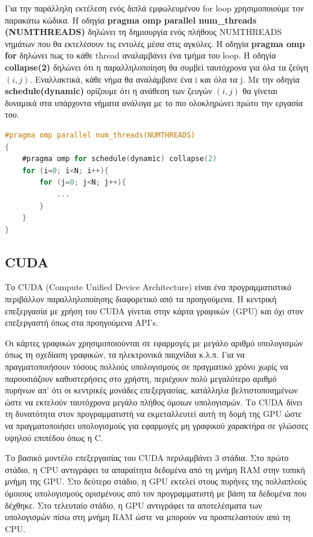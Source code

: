 \documentclass[12pt,a4paper]{article}
\begin{document}
Για την παράλληλη εκτέλεση ενός διπλά εμφωλευμένου for loop χρησιμοποιούμε τον παρακάτω κώδικα. Η οδηγία \textbf{pragma omp parallel num\_threads (NUMTHREADS)} δηλώνει τη δημιουργία ενός πλήθους NUMTHREADS νημάτων που θα εκτελέσουν τις εντολές μέσα στις αγκύλες. Η οδηγία \textbf{pragma omp for} δηλώνει πως το κάθε thread αναλαμβάνει ένα τμήμα του loop. Η οδηγία \textbf{collapse(2)} δηλώνει ότι η παραλληλοποίηση θα συμβεί ταυτόχρονα για όλα τα ζεύγη $(i,j)$. Εναλλακτικά, κάθε νήμα θα αναλάμβανε ένα i και όλα τα j. Με την οδηγία \textbf{schedule(dynamic)} ορίζουμε ότι η ανάθεση των ζευγών $(i,j)$ θα γίνεται δυναμικά στα υπάρχοντα νήματα ανάλογα με το πιο ολοκληρώνει πρώτο την εργασία του.

\begin{lstlisting}[language=C,frame=single]
#pragma omp parallel num_threads(NUMTHREADS)
{
	#pragma omp for schedule(dynamic) collapse(2)
	for (i=0; i<N; i++){
		for (j=0; j<N; j++){
			...
		}
	}
}
\end{lstlisting}

\subsection{CUDA}

Το CUDA (Compute Unified Device Architecture) \cite{nickolls_scalable_2008} είναι ένα προγραμματιστικό περιβάλλον παραλληλοποίησης διαφορετικό από τα προηγούμενα. Η κεντρική επεξεργασία με χρήση του CUDA γίνεται στην κάρτα γραφικών (GPU) και όχι στον επεξεργαστή όπως στα προηγούμενα API's.

Οι κάρτες γραφικών χρησιμοποιούνται σε εφαρμογές με μεγάλο αριθμό υπολογισμών όπως τη σχεδίαση γραφικών, τα ηλεκτρονικά παιχνίδια κ.λ.π. Για να πραγματοποιήσουν τόσους πολλούς υπολογισμούς σε πραγματικό χρόνο χωρίς να παρουσιάζουν καθυστερήσεις στο χρήστη, περιέχουν πολύ μεγαλύτερο αριθμό πυρήνων απ' ότι οι κεντρικές μονάδες επεξεργασίας, κατάλληλα βελτιστοποιημένων ώστε να εκτελούν ταυτόχρονα μεγάλο πλήθος όμοιων υπολογισμών. Το CUDA δίνει τη δυνατότητα στον προγραμματιστή να εκμεταλλευτεί αυτή τη δομή της GPU ώστε να πραγματοποιήσει υπολογισμούς για εφαρμογές μη γραφικού χαρακτήρα σε γλώσσες υψηλού επιπέδου όπως η C.

Το βασικό μοντέλο επεξεργασίας του CUDA περιλαμβάνει 3 στάδια. Στο πρώτο στάδιο, η CPU αντιγράφει τα απαραίτητα δεδομένα από τη μνήμη RAM στην τοπική μνήμη της GPU. Στο δεύτερο στάδιο, η GPU εκτελεί στους πυρήνες της πολλαπλούς όμοιους υπολογισμούς ορισμένους από τον προγραμματιστή με βάση τα δεδομένα που δέχθηκε. Στο τελευταίο στάδιο, η GPU αντιγράφει τα αποτελέσματα των υπολογισμών πίσω στη μνήμη RAM ώστε να μπορούν να προσπελαστούν από τη CPU.
\end{document}
